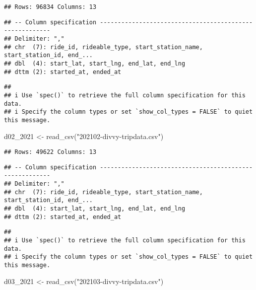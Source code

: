 \documentclass[
]{article}
\newenvironment{Shaded}{\begin{snugshade}}{\end{snugshade}}
\newcommand{\FunctionTok}[1]{\textcolor[rgb]{0.00,0.00,0.00}{#1}}
\newcommand{\NormalTok}[1]{#1}
\newcommand{\OtherTok}[1]{\textcolor[rgb]{0.56,0.35,0.01}{#1}}
\newcommand{\StringTok}[1]{\textcolor[rgb]{0.31,0.60,0.02}{#1}}
\begin{document}
\begin{verbatim}
## Rows: 96834 Columns: 13
\end{verbatim}

\begin{verbatim}
## -- Column specification --------------------------------------------------------
## Delimiter: ","
## chr  (7): ride_id, rideable_type, start_station_name, start_station_id, end_...
## dbl  (4): start_lat, start_lng, end_lat, end_lng
## dttm (2): started_at, ended_at
\end{verbatim}

\begin{verbatim}
## 
## i Use `spec()` to retrieve the full column specification for this data.
## i Specify the column types or set `show_col_types = FALSE` to quiet this message.
\end{verbatim}

\begin{Shaded}
\begin{Highlighting}[]
\NormalTok{d02\_2021 }\OtherTok{\textless{}{-}} \FunctionTok{read\_csv}\NormalTok{(}\StringTok{"202102{-}divvy{-}tripdata.csv"}\NormalTok{)}
\end{Highlighting}
\end{Shaded}

\begin{verbatim}
## Rows: 49622 Columns: 13
\end{verbatim}

\begin{verbatim}
## -- Column specification --------------------------------------------------------
## Delimiter: ","
## chr  (7): ride_id, rideable_type, start_station_name, start_station_id, end_...
## dbl  (4): start_lat, start_lng, end_lat, end_lng
## dttm (2): started_at, ended_at
\end{verbatim}

\begin{verbatim}
## 
## i Use `spec()` to retrieve the full column specification for this data.
## i Specify the column types or set `show_col_types = FALSE` to quiet this message.
\end{verbatim}

\begin{Shaded}
\begin{Highlighting}[]
\NormalTok{d03\_2021 }\OtherTok{\textless{}{-}} \FunctionTok{read\_csv}\NormalTok{(}\StringTok{"202103{-}divvy{-}tripdata.csv"}\NormalTok{)}
\end{Highlighting}
\end{Shaded}
\end{document}
